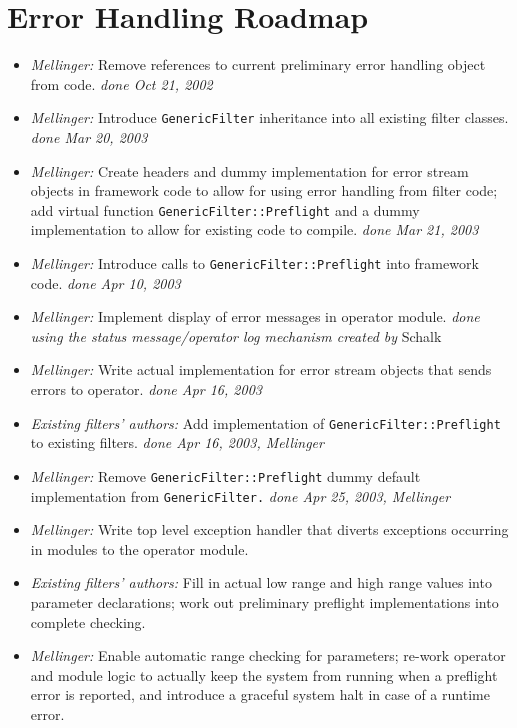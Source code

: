 \documentclass[12pt,a4paper]{article}
\begin{document}
\pagebreak
\section{Error Handling Roadmap}
\begin{flushleft}
\begin{itemize}
\item \textit{Mellinger:} Remove references to current preliminary error handling
object from code.
  \textit{done Oct 21, 2002}
\item \textit{Mellinger:} Introduce \texttt{GenericFilter} inheritance into all
existing filter classes.
  \textit{done Mar 20, 2003}
\item \textit{Mellinger:} Create headers and dummy implementation for error stream
objects in framework code to allow for using error handling from
filter code; add virtual function \texttt{GenericFilter::Preflight}
and a dummy implementation to allow for existing code to compile.
  \textit{done Mar 21, 2003}
\item \textit{Mellinger:} Introduce calls to \texttt{GenericFilter::Preflight} into
framework code.
  \textit{done Apr 10, 2003}
\item \textit{Mellinger:} Implement display of error messages in operator module.
  \textit{done using the status message/operator log mechanism created by} Schalk 
\item \textit{Mellinger:} Write actual implementation for error stream objects that
sends errors to operator.
  \textit{done Apr 16, 2003}
\item \textit{Existing filters' authors:} Add implementation of \texttt{GenericFilter::Preflight} to existing filters.
  \textit{done Apr 16, 2003, Mellinger}
\item \textit{Mellinger:} Remove \texttt{GenericFilter::Preflight} dummy default implementation from \texttt{GenericFilter.}
  \textit{done Apr 25, 2003, Mellinger}
\item \textit{Mellinger:} Write top level exception handler that diverts exceptions
occurring in modules to the operator module.
\item \textit{Existing filters' authors:} Fill in actual low range and high range 
values into parameter declarations; work out preliminary preflight implementations 
into complete checking.
\item \textit{Mellinger:} Enable automatic range checking for parameters; re-work operator and module logic to actually keep the system from running when a preflight error is
reported, and introduce a graceful system halt in case of a runtime error.
\end{itemize}
\end{flushleft}
\end{document}
